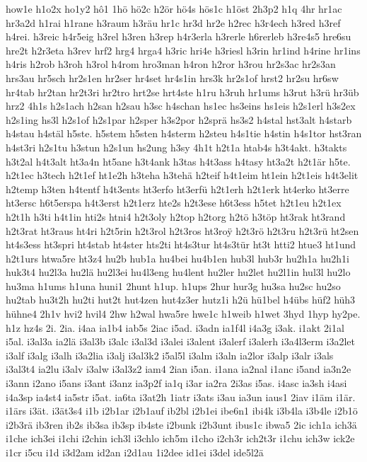 {how1e
h1o2x
ho1y2
hô1
1hö
hö2c
h2ör
hö4s
hös1c
h1öst
2h3p2
h1q
4hr
hr1ac
hr3a2d
h1rai
h1rane
h3raum
h3räu
hr1c
hr3d
hr2e
h2rec
h3r4ech
h3red
h3ref
h4rei.
h3reic
h4r5eig
h3rel
h3ren
h3rep
h4r3erla
h3rerle
h6rerleb
h3re4s5
hre6su
hre2t
h2r3eta
h3rev
hrf2
hrg4
hrga4
h3ric
hri4e
h3riesl
h3rin
hr1ind
h4rine
hr1ins
h4ris
h2rob
h3roh
h3rol
h4rom
hro3man
h4ron
h2ror
h3rou
hr2s3ac
hr2s3an
hrs3au
hr5sch
hr2s1en
hr2ser
hr4set
hr4s1in
hrs3k
hr2s1of
hrst2
hr2su
hr6sw
hr4tab
hr2tan
hr2t3ri
hr2tro
hrt2se
hrt4ste
h1ru
h3ruh
hr1ums
h3rut
h3rü
hr3üb
hrz2
4h1s
h2s1ach
h2san
h2sau
h3sc
h4schan
hs1ec
hs3eins
hs1eis
h2s1erl
h3s2ex
h2s1ing
hs3l
h2s1of
h2s1par
h2sper
h3s2por
h2sprä
hs3s2
h4stal
hst3alt
h4starb
h4stau
h4stäl
h5ste.
h5stem
h5sten
h4sterm
h2steu
h4s1tie
h4stin
h4s1tor
hst3ran
h4st3ri
h2s1tu
h3stun
h2s1un
hs2ung
h3sy
4h1t
h2t1a
htab4s
h3t4akt.
h3takts
h3t2al
h4t3alt
ht3a4n
ht5ane
h3t4ank
h3tas
h4t3ass
h4tasy
ht3a2t
h2t1är
h5te.
h2t1ec
h3tech
h2t1ef
ht1e2h
h3teha
h3tehä
h2teif
h4t1eim
ht1ein
h2t1eis
h4t3elit
h2temp
h3ten
h4tentf
h4t3ents
ht3erfo
ht3erfü
h2t1erh
h2t1erk
ht4erko
ht3erre
ht3ersc
h6t5erspa
h4t3erst
h2t1erz
hte2s
h2t3ese
h6t3ess
h5tet
h2t1eu
h2t1ex
h2t1h
h3ti
h4t1in
hti2s
htni4
h2t3oly
h2top
h2torg
h2tö
h3töp
ht3rak
ht3rand
h2t3rat
ht3raus
ht4ri
h2t5rin
h2t3rol
h2t3ros
ht3ro^^ff
h2t3rö
h2t3ru
h2t3rü
ht2sen
ht4s3ess
ht3spri
ht4stab
ht4ster
hts2ti
ht4s3tur
ht4s3tür
ht3t
htti2
htue3
ht1und
h2t1urs
htwa5re
ht3z4
hu2b
hub1a
hu4bei
hu4b1en
hub3l
hub3r
hu2h1a
hu2h1i
huk3t4
hu2l3a
hu2lä
hu2l3ei
hu4l3eng
hu4lent
hu2ler
hu2let
hu2l1in
hul3l
hu2lo
hu3ma
h1ums
h1una
huni1
2hunt
h1up.
h1ups
2hur
hur3g
hu3sa
hu2sc
hu2so
hu2tab
hu3t2h
hu2ti
hut2t
hut4zen
hut4z3er
hutz1i
h2ü
hü1bel
h4übs
hüf2
hüh3
hühne4
2h1v
hvi2
hvil4
2hw
h2wal
hwa5re
hwe1c
h1weib
h1wet
3hyd
1hyp
hy2pe.
h1z
hz4s
2i.
2ia.
i4aa
ia1b4
iab5s
2iac
i5ad.
i3adn
ia1f4l
i4a3g
i3ak.
i1akt
2i1al
i5al.
i3al3a
ia2lä
i3al3b
i3alc
i3al3d
i3alei
i3alent
i3alerf
i3alerh
i3a4l3erm
i3a2let
i3alf
i3alg
i3alh
i3a2lia
i3alj
i3al3k2
i5al5l
i3alm
i3aln
ia2lor
i3alp
i3alr
i3als
i3al3t4
ia2lu
i3alv
i3alw
i3al3z2
iam4
2ian
i5an.
i1ana
ia2nal
i1anc
i5and
ia3n2e
i3ann
i2ano
i5ans
i3ant
i3anz
ia3p2f
ia1q
i3ar
ia2ra
2i3as
i5as.
i4asc
ia3sh
i4asi
i4a3sp
ia4st4
ia5str
i5at.
ia6ta
i3at2h
1iatr
i3ats
i3au
ia3un
iaus1
2iav
i1äm
i1är.
i1ärs
i3ät.
i3ät3s4
i1b
i2b1ar
i2b1auf
ib2bl
i2b1ei
ibe6n1
ibi4k
i3b4la
i3b4le
i2b1ö
i2b3rä
ib3ren
ib2s
ib3sa
ib3sp
ib4ste
i2bunk
i2b3unt
ibus1c
ibwa5
2ic
ich1a
ich3ä
i1che
ich3ei
i1chi
i2chin
ich3l
i3chlo
ich5m
i1cho
i2ch3r
ich2t3r
i1chu
ich3w
ick2e
i1cr
i5cu
i1d
i3d2am
id2an
i2d1au
1i2dee
id1ei
i3del
ide5l2ä
}
